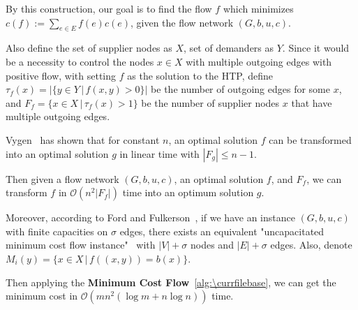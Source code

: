\documentclass[catalog.tex]{subfiles}
\begin{document}
By this construction, our goal is to find the flow $f$ which minimizes $c(f) := \sum_{e\in E} f(e)c(e)$, given the flow network $(G, b, u, c)$.

Also define the set of supplier nodes as $X$, set of demanders as $Y$. Since it would be a necessity to control the nodes $x \in X$ with multiple outgoing edges with positive flow, with setting $f$ as the solution to the HTP, define $\tau_f(x) = |\{y\in Y\, |\, f(x,y) > 0\}|$ be the number of outgoing edges for some $x$, and $F_f = \{x\in X\, |\, \tau_f(x) > 1\}$ be the number of supplier nodes $x$ that have multiple outgoing edges.

Vygen~\cite{vygen_2005} has shown that for constant $n$, an optimal solution $f$ can be transformed into an optimal solution $g$ in linear time with $|F_g| \leq n - 1$.

Then given a flow network $(G, b, u, c)$, an optimal solution $f$, and $F_f$, we can transform $f$ in $\mathcal{O}(n^2|F_f|)$ time into an optimum solution $g$.

Moreover, according to Ford and Fulkerson~\cite{ford_fulkerson_1962}, if we have an instance $(G, b, u, c)$ with finite capacities on $\sigma$ edges, there exists an equivalent "uncapacitated minimum cost flow instance"~\cite{brenner_2008} with $|V|+\sigma$ nodes and $|E|+\sigma$ edges. Also, denote $M_i(y) = \{x\in X\, |\, f((x,y)) = b(x)\}$.

Then applying the \textbf{Minimum Cost Flow}~\ref{alg:\currfilebase}, we can get the minimum cost in $\mathcal{O}(mn^2(\log m + n\log n))$ time.
\end{document}
